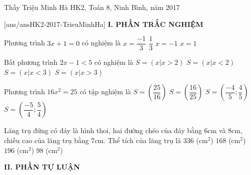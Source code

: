 \begin{name}
{Thầy  Triệu Minh Hà}
{HK2, Toán 8, Ninh Bình, năm 2017}
\end{name}
[ans/ansHK2-2017-TrieuMinhHa]
\noindent\textbf{I. PHẦN TRẮC NGHIỆM}
\setcounter{ex}{0}
\begin{ex}%
    Phương trình $3x+1=0$ có nghiệm là
    \choice
        {\True $x=\dfrac{-1}{3}$}
        {$\dfrac{1}{3}$}
        {$x=-1$}
        {$x=1$}
\end{ex}
\begin{ex}%
	Bất phương trình $2x-1<5$ có nghiệm là
	\choice
	{$S=\left( x|x>2\right) $}
	{$S=\left( x|x<2\right) $}
	{\True $S=\left( x|x<3\right) $}
	{$S=\left( x|x>3\right)$ }
\end{ex}
\begin{ex}%
	Phương trình $16x^2=25$ có tập nghiệm là
	\choice
	{$S=\left( \dfrac{25}{16}\right)  $}
	{\True $S=\left( \dfrac{16}{25}\right) $}
	{$S=\left( \dfrac{-4}{5};\dfrac{4}{5}\right) $}
	{$S=\left( \dfrac{-5}{4};\dfrac{5}{4}\right) $}
\end{ex}
\begin{ex}%
	Lăng trụ đứng có đáy là hình thoi, hai đường chéo của đáy bằng $6$cm và $8$cm, chiều cao của lăng trụ bằng $7$cm. Thể tích của lăng trụ là
	\choice
	{$336$ (cm$^2$)}
	{\True $168$ (cm$^2$)}
	{$196$ (cm$^2$)}
	{$98$ (cm$^2$)}
\end{ex}
\noindent\textbf{II. PHẦN TỰ LUẬN}
\setcounter{ex}{0}
